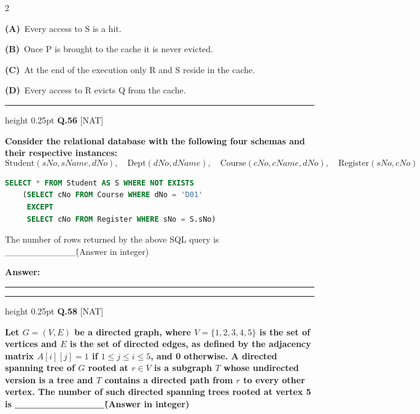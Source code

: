 \documentclass[a4paper,10pt,twoside]{article}
\begin{document}
\begin{multicols}{2}
\par\vspace{2pt}\noindent
\textbf{(A)}~Every access to S is a hit.\par\vspace{2pt}\noindent
\textbf{(B)}~Once P is brought to the cache it is never evicted.\par\vspace{2pt}\noindent
\textbf{(C)}~At the end of the execution only R and S reside in the cache.\par\vspace{2pt}\noindent
\textbf{(D)}~Every access to R evicts Q from the cache.
\par\vspace{6pt}\hrule height 0.25pt\vspace{6pt}
\noindent\textbf{Q.56} \hfill {\footnotesize\textsf{[NAT]}}
\par\vspace{2pt}
{\bfseries Consider the relational database with the following four schemas and their respective instances:
\[ \text{Student}(sNo, sName, dNo), \quad \text{Dept}(dNo, dName), \quad \text{Course}(cNo, cName, dNo), \quad \text{Register}(sNo, cNo) \]
\begin{lstlisting}[language=SQL]
SELECT * FROM Student AS S WHERE NOT EXISTS
    (SELECT cNo FROM Course WHERE dNo = 'D01'
     EXCEPT
     SELECT cNo FROM Register WHERE sNo = S.sNo)
\end{lstlisting}
The number of rows returned by the above SQL query is \_\_\_\_\_\_\_\_\_\_\_\. (Answer in integer) \par}
\par\vspace{3pt}\noindent\textbf{Answer:} \rule{3.2cm}{0.4pt}
\par\vspace{6pt}\hrule height 0.25pt\vspace{6pt}
\noindent\textbf{Q.58} \hfill {\footnotesize\textsf{[NAT]}}
\par\vspace{2pt}
{\bfseries Let $G = (V, E)$ be a directed graph, where $V = \{1, 2, 3, 4, 5\}$ is the set of vertices and $E$ is the set of directed edges, as defined by the adjacency matrix $A[i][j] = 1$ if $1 \le j \le i \le 5$, and 0 otherwise. A directed spanning tree of $G$ rooted at $r \in V$ is a subgraph $T$ whose undirected version is a tree and $T$ contains a directed path from $r$ to every other vertex. The number of such directed spanning trees rooted at vertex 5 is \_\_\_\_\_\_\_\_\_\_\_\_\. (Answer in integer) \par}

\end{multicols}
\end{document}
